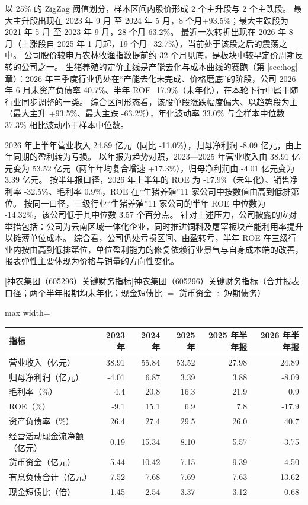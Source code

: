 以 25\% 的 ZigZag 阈值划分，样本区间内股价形成 2 个主升段与 2 个主跌段。 最大主升段出现在 2023 年 9 月 至 2024 年 5 月，8 个月+93.5\%；最大主跌段为 2021 年 5 月 至 2023 年 9 月，28 个月-63.2\%。 最近一次转折出现在 2026 年 8 月（上涨段自 2025 年 1 月起，19 个月+32.7\%），当前处于该段之后的震荡之中。 公司股价较申万农林牧渔指数提前约 32 个月见底，是板块中较早定价周期反转的公司之一。 生猪养殖的定价主线是产能去化与成本曲线的赛跑（第 \ref{sec:hog} 章）：2026 年三季度行业仍处在“产能去化未完成、价格磨底”的阶段，公司 2026 年 6 月末资产负债率 40.7\%、半年 ROE -17.9\%（未年化），在本轮下行中属于随行业同步调整的一类。 综合区间形态看，该股单段涨跌幅度偏大、以趋势段为主（最大主升 +93.5\%、最大主跌 -63.2\%），年化波动率 33.0\% 与全样本中位数 37.3\% 相比波动小于样本中位数。

 2026 年上半年营业收入 24.89 亿元（同比 -11.0\%），归母净利润 -8.09 亿元，由上年同期的盈利转为亏损。 以年报为趋势对照，2023---2025 年营业收入由 38.91 亿元变为 53.52 亿元（两年年均复合增速 +17.3\%），归母净利润由 -4.01 亿元变为 3.39 亿元。 按半年报口径，2026 年上半年的 ROE 为 -17.9\%（未年化）、销售净利率 -32.5\%、毛利率 0.9\%，ROE 在“生猪养殖”11 家公司中按数值由高到低排第位。 按同一口径，三级行业“生猪养殖”11 家公司的半年 ROE 中位数为 -14.32\%，该公司低于其中位数 3.57 个百分点。 针对上述压力，公司披露的应对举措包括：公司为云南区域一体化企业，同时推进饲料及屠宰板块产能利用率提升以摊薄单位成本。 综合看，公司仍处亏损区间、由盈转亏，半年 ROE 在三级行业内按由高到低排第位，单位盈利能力的修复依赖行业景气与自身成本端的改善，报表弹性主要体现为价格与销量的方向性变化。

\begin{center}\small\setlength{\tabcolsep}{3.4pt}
[神农集团（605296）关键财务指标]{神农集团（605296）关键财务指标（合并报表口径；两个半年报期均未年化；现金短债比 $=$ 货币资金 $\div$ 短期债务）}
\begin{adjustbox}{max width=\textwidth}
\begin{tabular}{@{}lrrrrr@{}}
\toprule
指标 & 2023 年 & 2024 年 & 2025 年 & 2025 年半年报 & 2026 年半年报 \\
\midrule
营业收入（亿元） & 38.91 & 55.84 & 53.52 & 27.98 & 24.89 \\
归母净利润（亿元） & -4.01 & 6.87 & 3.39 & 3.88 & -8.09 \\
毛利率（\%） & 4.4 & 20.8 & 16.3 & 21.9 & 0.9 \\
ROE（\%） & -9.1 & 15.1 & 6.9 & 7.8 & -17.9 \\
资产负债率（\%） & 26.4 & 27.4 & 29.5 & 26.0 & 40.7 \\
经营活动现金流净额（亿元） & 0.19 & 15.34 & 8.10 & 5.57 & -3.75 \\
货币资金（亿元） & 5.44 & 10.42 & 7.15 & 9.39 & 4.50 \\
有息负债合计（亿元） & 7.52 & 7.68 & 7.69 & 7.63 & 13.62 \\
现金短债比（倍） & 1.45 & 2.54 & 3.37 & 3.12 & 0.68 \\
\bottomrule
\end{tabular}
\end{adjustbox}
\end{center}

